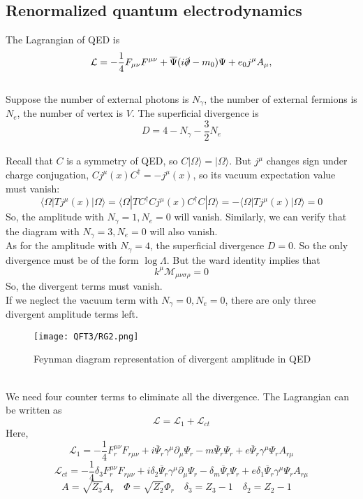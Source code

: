\subsection{Renormalized quantum electrodynamics}
The Lagrangian of QED is
\[\mathcal{L} = -\frac{1}{4}F_{\mu\nu}F^{\mu\nu} + \overline{\Psi} (i\slashed{\partial}-m_0) \Psi + e_0j^{\mu} A_{\mu}, \]
\\
Suppose the number of external photons is $N_{\gamma}$, the number of external fermions is $N_{e}$, the number of vertex is $V$. The superficial divergence is
\[D = 4 -N_{\gamma} - \frac{3}{2}N_{e}\]
\\
Recall that $C$ is a symmetry of QED, so $C|\Omega\rangle = | \Omega \rangle$. But $j^{\mu}$ changes sign under charge conjugation, $C j^{\mu}(x)C^{\dagger} = - j^{\mu}(x)$, so its vacuum expectation value must vanish:
\[\langle \Omega | T j^{\mu}(x) | \Omega \rangle = \langle \Omega | T C^{\dagger}C j^{\mu}(x)C^{\dagger}C | \Omega \rangle = -\langle \Omega | T j^{\mu}(x) | \Omega \rangle = 0 \]
So, the amplitude with $N_{\gamma} = 1,N_{e}=0$ will vanish. Similarly, we can verify that the diagram with $N_{\gamma} = 3,N_e=0$ will also vanish.
\\
As for the amplitude with $N_{\gamma} = 4$, the superficial divergence $D = 0$. So the only divergence must be of the form $\log \Lambda$. But the ward identity implies that
\[k^{\mu}\mathcal{M}_{\mu\nu\sigma\rho} = 0\]
So, the divergent terms must vanish.
\\
If we neglect the vacuum term with $N_{\gamma}=0,N_{e}=0$, there are only three divergent amplitude terms left. 
\begin{figure}[!h]
\centering
\texttt{[image: QFT3/RG2.png]}
\caption{Feynman diagram representation of divergent amplitude in QED}
\end{figure}\\
We need four counter terms to eliminate all the divergence. The Lagrangian can be written as
\[\mathcal{L} = \mathcal{L}_1 + \mathcal{L}_{ct}\]
Here,
\[\mathcal{L}_1 = -\frac{1}{4}F_r^{\mu\nu}F_{r\mu\nu} +  i\overline{\Psi}_r \gamma^{\mu} \partial_{\mu} \Psi_r - m \overline{\Psi}_r \Psi_r + e \overline{\Psi}_r\gamma^{\mu}\Psi_r A_{r\mu} \]
\[\mathcal{L}_{ct} = -\frac{1}{4}\delta_3 F_r^{\mu\nu}F_{r\mu\nu} + i\delta_{2}\overline{\Psi}_r \gamma^{\mu} \partial_{\mu} \Psi_r - \delta_m \overline{\Psi}_r \Psi_r + e \delta_1 \overline{\Psi}_r\gamma^{\mu}\Psi_r A_{r\mu} \]
\[A = \sqrt{Z_3}A_r \quad \Phi  = \sqrt{Z_2}\Phi_r \quad \delta_{3} = Z_3 - 1 \quad \delta_{2} = Z_2 - 1 \quad \]
